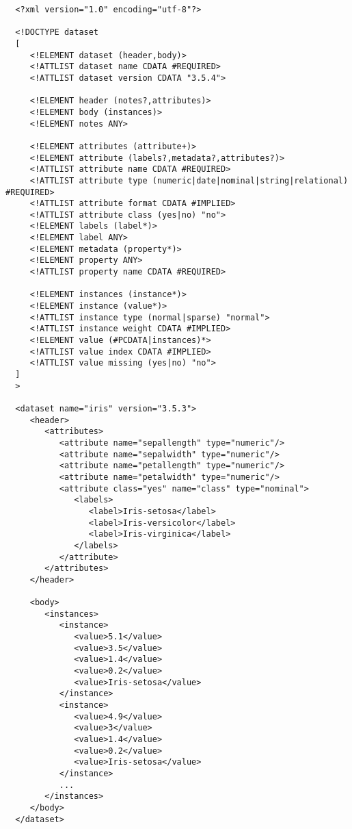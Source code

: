 \begin{verbatim}
  <?xml version="1.0" encoding="utf-8"?>

  <!DOCTYPE dataset
  [
     <!ELEMENT dataset (header,body)>
     <!ATTLIST dataset name CDATA #REQUIRED>
     <!ATTLIST dataset version CDATA "3.5.4">

     <!ELEMENT header (notes?,attributes)>
     <!ELEMENT body (instances)>
     <!ELEMENT notes ANY>   

     <!ELEMENT attributes (attribute+)>
     <!ELEMENT attribute (labels?,metadata?,attributes?)>
     <!ATTLIST attribute name CDATA #REQUIRED>
     <!ATTLIST attribute type (numeric|date|nominal|string|relational) #REQUIRED>
     <!ATTLIST attribute format CDATA #IMPLIED>
     <!ATTLIST attribute class (yes|no) "no">
     <!ELEMENT labels (label*)>   
     <!ELEMENT label ANY>
     <!ELEMENT metadata (property*)>
     <!ELEMENT property ANY>
     <!ATTLIST property name CDATA #REQUIRED>

     <!ELEMENT instances (instance*)>
     <!ELEMENT instance (value*)>
     <!ATTLIST instance type (normal|sparse) "normal">
     <!ATTLIST instance weight CDATA #IMPLIED>
     <!ELEMENT value (#PCDATA|instances)*>
     <!ATTLIST value index CDATA #IMPLIED>   
     <!ATTLIST value missing (yes|no) "no">
  ]
  >

  <dataset name="iris" version="3.5.3">
     <header>
        <attributes>
           <attribute name="sepallength" type="numeric"/>
           <attribute name="sepalwidth" type="numeric"/>
           <attribute name="petallength" type="numeric"/>
           <attribute name="petalwidth" type="numeric"/>
           <attribute class="yes" name="class" type="nominal">
              <labels>
                 <label>Iris-setosa</label>
                 <label>Iris-versicolor</label>
                 <label>Iris-virginica</label>
              </labels>
           </attribute>
        </attributes>
     </header>

     <body>
        <instances>
           <instance>
              <value>5.1</value>
              <value>3.5</value>
              <value>1.4</value>
              <value>0.2</value>
              <value>Iris-setosa</value>
           </instance>
           <instance>
              <value>4.9</value>
              <value>3</value>
              <value>1.4</value>
              <value>0.2</value>
              <value>Iris-setosa</value>
           </instance>
           ...
        </instances>
     </body>
  </dataset>
\end{verbatim}

